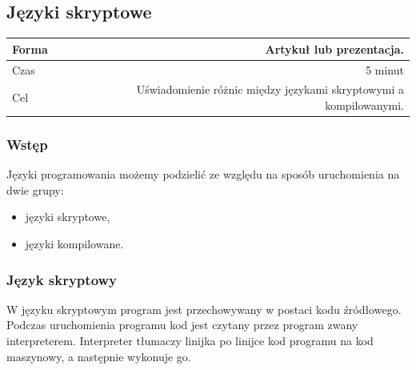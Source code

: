 \documentclass{mwart}
\begin{document}
\subsection{Języki skryptowe}
\begin{center}
  \begin{tabular}{lr}
    \toprule
    Forma & Artykuł lub prezentacja. \\
    \midrule
    Czas & 5 minut \\
    Cel & Uświadomienie różnic między językami skryptowymi a kompilowanymi. \\
    \bottomrule
  \end{tabular}
\end{center}

\subsubsection{Wstęp}
Języki programowania możemy podzielić ze względu na sposób uruchomienia na dwie grupy:

\begin{itemize}
  \item języki skryptowe,
  \item języki kompilowane.
\end{itemize}

\subsubsection{Język skryptowy}
W języku skryptowym program jest przechowywany w postaci kodu źródłowego. Podczas
uruchomienia programu kod jest czytany przez program zwany interpreterem. Interpreter
tłumaczy linijka po linijce kod programu na kod maszynowy, a następnie wykonuje go.
\end{document}
